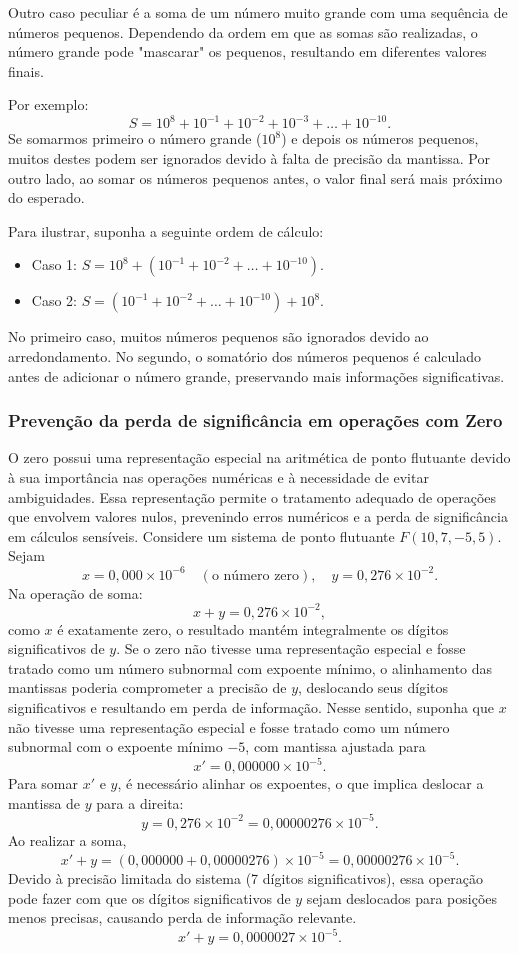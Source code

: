 Outro caso peculiar é a soma de um número muito grande com uma sequência de números pequenos. Dependendo da ordem em que as somas são realizadas, o número grande pode "mascarar" os pequenos, resultando em diferentes valores finais.

Por exemplo:
\[
S = 10^{8} + 10^{-1} + 10^{-2} + 10^{-3} + \ldots + 10^{-10}.
\]
Se somarmos primeiro o número grande (\(10^8\)) e depois os números pequenos, muitos destes podem ser ignorados devido à falta de precisão da mantissa. Por outro lado, ao somar os números pequenos antes, o valor final será mais próximo do esperado.

Para ilustrar, suponha a seguinte ordem de cálculo:
\begin{itemize}
    \item Caso 1: \(S = 10^{8} + (10^{-1} + 10^{-2} + \ldots + 10^{-10})\).
    \item Caso 2: \(S = (10^{-1} + 10^{-2} + \ldots + 10^{-10}) + 10^{8}\).
\end{itemize}
No primeiro caso, muitos números pequenos são ignorados devido ao arredondamento. No segundo, o somatório dos números pequenos é calculado antes de adicionar o número grande, preservando mais informações significativas.

\subsubsection*{Prevenção da perda de significância em operações com Zero}
\label{subsec:repZero}

O zero possui uma representação especial na aritmética de ponto flutuante devido à sua importância nas operações numéricas e à necessidade de evitar ambiguidades. Essa representação permite o tratamento adequado de operações que envolvem valores nulos, prevenindo erros numéricos e a perda de significância em cálculos sensíveis.
Considere um sistema de ponto flutuante \( F(10, 7, -5, 5) \). Sejam  
\[
x = 0{,}000 \times 10^{-6} \quad (\text{o número zero}), \quad y = 0{,}276 \times 10^{-2}.
\]
Na operação de soma:
\[
x + y = 0{,}276 \times 10^{-2},
\]
como \( x \) é exatamente zero, o resultado mantém integralmente os dígitos significativos de \( y \).
Se o zero não tivesse uma representação especial e fosse tratado como um número subnormal com expoente mínimo, o alinhamento das mantissas poderia comprometer a precisão de \( y \), deslocando seus dígitos significativos e resultando em perda de informação.
Nesse sentido, suponha que \( x \) não tivesse uma representação especial e fosse tratado como um número subnormal com o expoente mínimo \( -5 \), com mantissa ajustada para
\[
x' = 0{,}000000 \times 10^{-5}.
\]
Para somar \( x' \) e \( y \), é necessário alinhar os expoentes, o que implica deslocar a mantissa de \( y \) para a direita:
\[
y = 0{,}276 \times 10^{-2} = 0{,}00000276 \times 10^{-5}.
\]
Ao realizar a soma,
\[
x' + y = (0{,}000000 + 0{,}00000276) \times 10^{-5} = 0{,}00000276 \times 10^{-5}.
\]
Devido à precisão limitada do sistema (7 dígitos significativos), essa operação pode fazer com que os dígitos significativos de \( y \) sejam deslocados para posições menos precisas, causando perda de informação relevante.
\[
x' + y = 0{,}0000027 \times 10^{-5}.
\]

